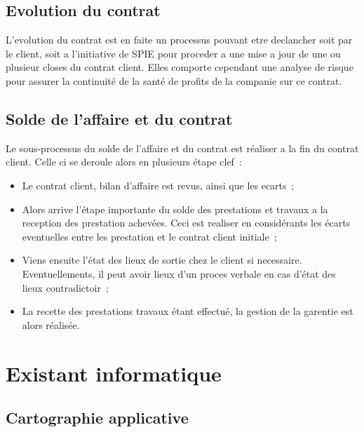 \subsection{Evolution du contrat}

L'evolution du contrat  est en faite un processus pouvant etre declancher soit par le client, soit
a l'initiative de SPIE pour proceder a une mise a jour de une ou plusieur closes du contrat client.
Elles comporte cependant une analyse de risque pour assurer la continuit\'e de la sant\'e de profits
de la companie sur ce contrat.


\subsection{Solde de l'affaire et du contrat}

Le sous-processus du solde de l'affaire et du contrat est r\'ealiser a la fin du contrat client. Celle
ci se deroule alors en plusieurs \'etape clef~:

\begin{itemize}
    \item Le contrat client, bilan d'affaire est revus, ainsi que les ecarts~;
    \item Alors arrive l'\'etape importante du solde des prestations et travaux a la reception des
    prestation achev\'ees. Ceci est realiser en consid\'erants les \'ecarts eventuelles entre les
    prestation et le contrat client initiale~;
    \item Viens ensuite l'\'etat des lieux de sortie chez le client si necessaire. Eventuellements,
    il peut avoir lieux d'un proces verbale en cas d'\'etat des lieux contradictoir~;
    \item La recette des prestations travaux \'etant effectu\'e, la gestion de la garentie est alors
    r\'ealis\'ee.
\end{itemize}

\pagebreak

\section{Existant informatique}

\subsection{Cartographie applicative}

